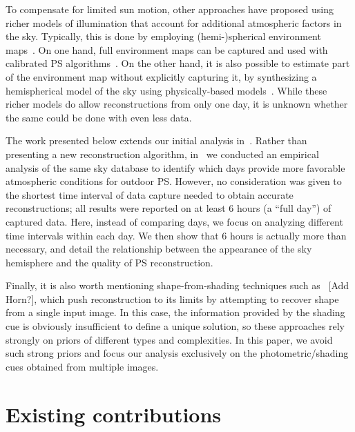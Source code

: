 \documentclass{report}
\begin{document}
To compensate for limited sun motion, other approaches have proposed using richer models of illumination that account for additional atmospheric factors in the sky. Typically, this is done by employing (hemi-)spherical environment maps~\cite{debevec-siggraph-98}. On one hand, full environment maps can be captured and used with calibrated PS algorithms~\cite{yu-iccp-13,shi-3dv-14,hung-wacv-15}. On the other hand, it is also possible to estimate part of the environment map without explicitly capturing it, by synthesizing a hemispherical model of the sky using physically-based models~\cite{inose-tcva-13,jung-cvpr-15}. While these richer models do allow reconstructions from only one day, it is unknown whether the same could be done with even less data.

The work presented below extends our initial analysis in~\cite{holdgeoffroy-iccp-15}. Rather than presenting a new reconstruction algorithm, in~\cite{holdgeoffroy-iccp-15} we conducted an empirical analysis of the same sky database to identify which days provide more favorable atmospheric conditions for outdoor PS. However, no consideration was given to the shortest time interval of data capture needed to obtain accurate reconstructions; all results were reported on at least 6 hours (a ``full day'') of captured data. Here, instead of comparing days, we focus on analyzing different time intervals within each day. We then show that 6 hours is actually more than necessary, and detail the relationship between the appearance of the sky hemisphere and the quality of PS reconstruction.

Finally, it is also worth mentioning shape-from-shading techniques such as~\cite{oxholm-eccv-12,johnson-cvpr-11,barron-pami-15} [Add Horn?], which push reconstruction to its limits by attempting to recover shape from a single input image. In this case, the information provided by the shading cue is obviously insufficient to define a unique solution, so these approaches rely strongly on priors of different types and complexities. In this paper, we avoid such strong priors and focus our analysis exclusively on the photometric/shading cues obtained from multiple images.




\chapter{Existing contributions}
\end{document}
